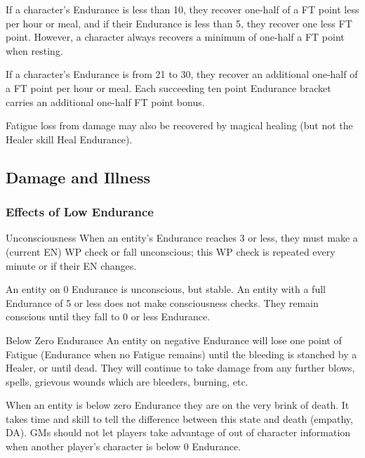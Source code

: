 \begin{multicols*}{3}
\begin{Enumerate}
\item
If a character's Endurance is less than 10, they recover one-half of a
FT point less per hour or meal, and if their Endurance is less than 5,
they recover one less FT point. However, a character always recovers a
minimum of one-half a FT point when resting.

\item
If a character's Endurance is from 21 to 30, they recover an
additional one-half of a FT point per hour or meal. Each succeeding
ten point Endurance bracket carries an additional one-half FT point
bonus.

\item
Fatigue loss from damage may also be recovered by magical healing (but
not the Healer skill Heal Endurance).
\end{Enumerate}

\subsection{Damage and Illness}

\subsubsection{Effects of Low Endurance}
\begin{Description}
\item[Unconsciousness] When an entity's Endurance reaches 3 or less,
they must make a (current EN) \x WP check or fall unconscious; this
WP check is repeated every minute or if their EN changes.

An entity on 0 Endurance is unconscious, but stable. An entity with a
full Endurance of 5 or less does not make consciousness checks. They
remain conscious until they fall to 0 or less Endurance.

\item[Below Zero Endurance] An entity on negative Endurance will lose
one point of Fatigue (Endurance when no Fatigue remains) until the
bleeding is stanched by a Healer, or until dead. They will continue to
take damage from any further blows, spells, grievous wounds which are
bleeders, burning, etc.

When an entity is below zero Endurance they are on the very brink of
death.  It takes time and skill to tell the difference between this
state and death (\eg empathy, DA). GMs should not let players take
advantage of out of character information when another player's
character is below 0 Endurance.


\end{Description}
\end{multicols*}
